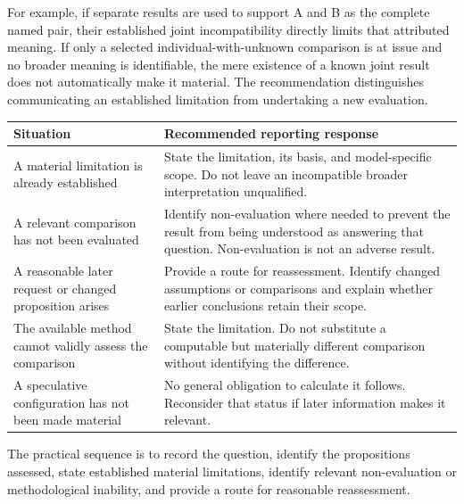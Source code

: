 \documentclass[
]{article}
\newcounter{none} %
\begin{document}
For example, if separate results are used to support A and B as the
complete named pair, their established joint incompatibility directly
limits that attributed meaning. If only a selected
individual-with-unknown comparison is at issue and no broader meaning is
identifiable, the mere existence of a known joint result does not
automatically make it material. The recommendation distinguishes
communicating an established limitation from undertaking a new
evaluation.

{\def\LTcaptype{none} %
\begin{longtable}[]{@{}
  >{\raggedright\arraybackslash}p{}
  >{\raggedright\arraybackslash}p{}@{}}
\toprule\noalign{}
\begin{minipage}[b]{\linewidth}\raggedright
Situation
\end{minipage} & \begin{minipage}[b]{\linewidth}\raggedright
Recommended reporting response
\end{minipage} \\
\midrule\noalign{}
\endhead
\bottomrule\noalign{}
\endlastfoot
A material limitation is already established & State the limitation, its
basis, and model-specific scope. Do not leave an incompatible broader
interpretation unqualified. \\
A relevant comparison has not been evaluated & Identify non-evaluation
where needed to prevent the result from being understood as answering
that question. Non-evaluation is not an adverse result. \\
A reasonable later request or changed proposition arises & Provide a
route for reassessment. Identify changed assumptions or comparisons and
explain whether earlier conclusions retain their scope. \\
The available method cannot validly assess the comparison & State the
limitation. Do not substitute a computable but materially different
comparison without identifying the difference. \\
A speculative configuration has not been made material & No general
obligation to calculate it follows. Reconsider that status if later
information makes it relevant. \\
\end{longtable}
}

The practical sequence is to record the question, identify the
propositions assessed, state established material limitations, identify
relevant non-evaluation or methodological inability, and provide a route
for reasonable reassessment.
\end{document}
